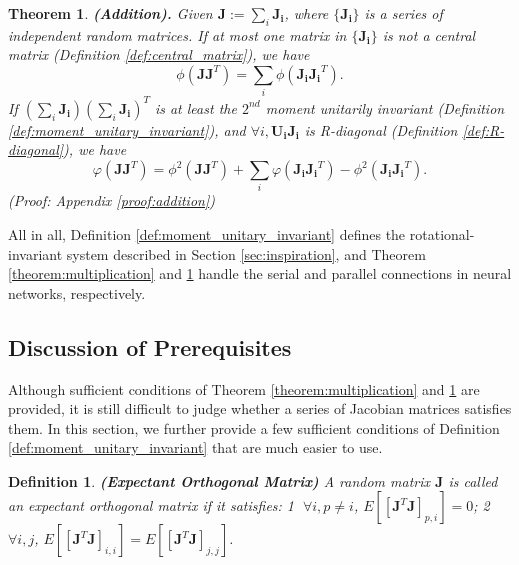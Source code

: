 \documentclass[10pt,journal,compsoc]{IEEEtran}
\newtheorem{theorem}{Theorem}[section]
\newtheorem{definition}{Definition}[section]
\begin{document}
\begin{theorem}
\textbf{(Addition).} Given $\mathbf{J} := \sum_{i}\mathbf{J_i}$, where $\{\mathbf{J_i}\}$ is a series of independent random matrices. If at most one matrix in $\{\mathbf{J_i}\}$ is not a central matrix (Definition \ref{def:central_matrix}), we have
\begin{equation}
    \phi\left(\mathbf{JJ}^T\right)=\sum_i \phi\left(\mathbf{J_iJ_i}^T\right).
\label{equ:add_expectation}
\end{equation}
If $(\sum_{i}\mathbf{J_i})(\sum_{i}\mathbf{J_i})^T$ is at least the $2^{nd}$ moment unitarily invariant (Definition \ref{def:moment_unitary_invariant}), and $\forall i, \mathbf{U_iJ_i}$ is R-diagonal (Definition \ref{def:R-diagonal}), we have
\begin{equation}
    \varphi\left(\mathbf{JJ}^T\right) = \phi^2\left(\mathbf{JJ}^T\right) + \sum_i \varphi\left(\mathbf{J_iJ_i}^T\right) - \phi^2\left(\mathbf{J_iJ_i}^T\right).
\label{equ:add_variance}
\end{equation}
(Proof: Appendix \ref{proof:addition})
\label{theorem:Addition}
\end{theorem}

All in all, Definition \ref{def:moment_unitary_invariant} defines the rotational-invariant system described in Section \ref{sec:inspiration}, and Theorem \ref{theorem:multiplication} and \ref{theorem:Addition} handle the serial and parallel connections in neural networks, respectively.

\subsection{Discussion of Prerequisites}

Although sufficient conditions of Theorem \ref{theorem:multiplication} and \ref{theorem:Addition} are provided, it is still difficult to judge whether a series of Jacobian matrices satisfies them. In this section, we further provide a few sufficient conditions of Definition \ref{def:moment_unitary_invariant} that are much easier to use.

\begin{definition}
\textbf{(Expectant Orthogonal Matrix)} A random matrix $\mathbf{J}$ is called an expectant orthogonal matrix if it satisfies: \textcircled{1} $\forall i, p\neq i$, $E[[\mathbf{J}^T\mathbf{J}]_{p,i}]=0$; \textcircled{2} $\forall i,j$, $E[[\mathbf{J}^T\mathbf{J}]_{i,i}]=E[[\mathbf{J}^T\mathbf{J}]_{j,j}]$.
\label{def:expectattion_diagonal_matrix}
\end{definition}
\end{document}
